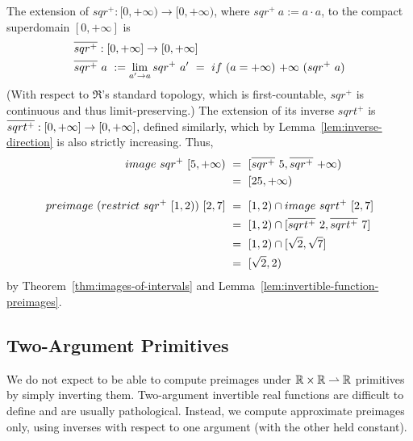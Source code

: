 \begin{example}
The extension of $sqr^+ : [0,+\infty) \to [0,+\infty)$, where $sqr^+~a := a \cdot a$, to the compact superdomain $[0,+\infty]$ is
\begin{equation}
\begin{aligned}
	&\cl{sqr^+} : [0,+\infty] \to [0,+\infty] \\
	&	\cl{sqr^+}~a\ := \lim_{a' \to a} sqr^+~a'
		\ =\ if~(a = +\infty)~{+\infty}~(sqr^+~a)
\end{aligned}
\end{equation}
(With respect to $\Re$'s standard topology, which is first-countable, $sqr^+$ is continuous and thus limit-preserving.)
The extension of its inverse $sqrt^+$ is $\cl{sqrt^+} : [0,+\infty] \to [0,+\infty]$, defined similarly, which by Lemma~\ref{lem:inverse-direction} is also strictly increasing.
Thus,
\begin{equation}
\begin{aligned}
	image~sqr^+~[5,+\infty)\ &=\ [\cl{sqr^+}~5,\cl{sqr^+}~{+\infty})
\\
		\ &=\ [25,+\infty)
\\[6pt]
	preimage~(restrict~sqr^+~[1,2))~[2,7]
		\ &=\ [1,2) \i image~sqrt^+~[2,7]
\\
		\ &=\ [1,2) \i [\cl{sqrt^+}~2,\cl{sqrt^+}~7]
\\
		\ &=\ [1,2) \i [\sqrt{2},\sqrt{7}]
\\
		\ &=\ [\sqrt{2},2)
\end{aligned}
\end{equation}
by Theorem~\ref{thm:images-of-intervals} and Lemma~\ref{lem:invertible-function-preimages}.
\exampleqed
\end{example}


\subsection{Two-Argument Primitives}

We do not expect to be able to compute preimages under $\mathbb{R} \times \mathbb{R} \rightharpoonup \mathbb{R}$ primitives by simply inverting them.
Two-argument invertible real functions are difficult to define and are usually pathological.
Instead, we compute approximate preimages only, using inverses with respect to one argument (with the other held constant).

